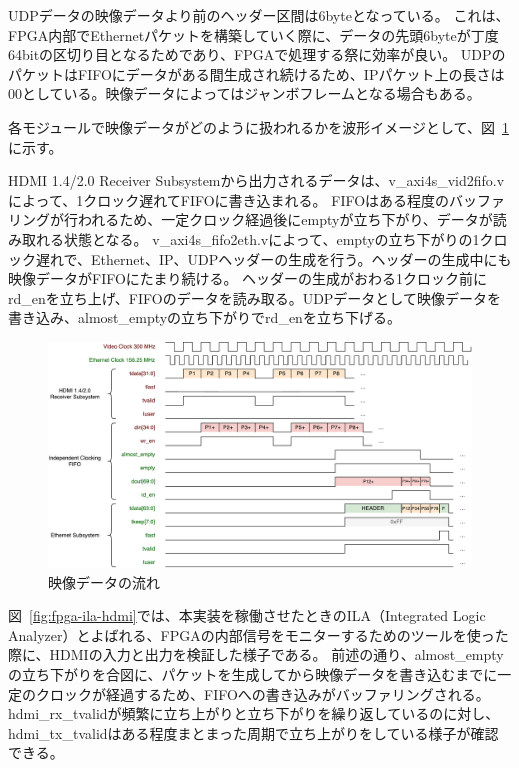 UDPデータの映像データより前のヘッダー区間は6byteとなっている。
これは、FPGA内部でEthernetパケットを構築していく際に、データの先頭6byteが丁度64bitの区切り目となるためであり、FPGAで処理する祭に効率が良い。
UDPのパケットはFIFOにデータがある間生成され続けるため、IPパケット上の長さは00としている。映像データによってはジャンボフレームとなる場合もある。

各モジュールで映像データがどのように扱われるかを波形イメージとして、図~\ref{fig:fpga-first-pixel-waveform}に示す。

HDMI 1.4/2.0 Receiver Subsystemから出力されるデータは、v\_axi4s\_vid2fifo.vによって、1クロック遅れてFIFOに書き込まれる。
FIFOはある程度のバッファリングが行われるため、一定クロック経過後にemptyが立ち下がり、データが読み取れる状態となる。
v\_axi4s\_fifo2eth.vによって、emptyの立ち下がりの1クロック遅れで、Ethernet、IP、UDPヘッダーの生成を行う。ヘッダーの生成中にも映像データがFIFOにたまり続ける。
ヘッダーの生成がおわる1クロック前にrd\_enを立ち上げ、FIFOのデータを読み取る。UDPデータとして映像データを書き込み、almost\_emptyの立ち下がりでrd\_enを立ち下げる。

\begin{figure}[htbp]
  \begin{center}
    \includegraphics[bb=0 0 942 502,width=22.5cm,angle=270]{img/fpga-first-pixel-waveform.pdf}
  \end{center}
  \caption{映像データの流れ}
  \label{fig:fpga-first-pixel-waveform}
\end{figure}

図~\ref{fig:fpga-ila-hdmi}では、本実装を稼働させたときのILA（Integrated Logic Analyzer）とよばれる、FPGAの内部信号をモニターするためのツールを使った際に、HDMIの入力と出力を検証した様子である。
前述の通り、almost\_emptyの立ち下がりを合図に、パケットを生成してから映像データを書き込むまでに一定のクロックが経過するため、FIFOへの書き込みがバッファリングされる。
hdmi\_rx\_tvalidが頻繁に立ち上がりと立ち下がりを繰り返しているのに対し、hdmi\_tx\_tvalidはある程度まとまった周期で立ち上がりをしている様子が確認できる。

